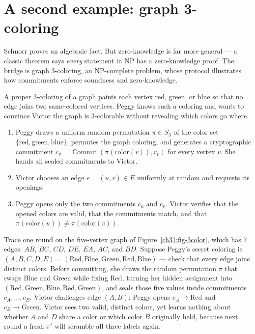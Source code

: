 \section{A second example: graph 3-coloring}
\label{ch31:3color}

Schnorr proves an algebraic fact. But zero-knowledge is far more general --- a
classic theorem says \emph{every} statement in \textsf{NP} has a zero-knowledge
proof. The bridge is graph 3-coloring, an \textsf{NP}-complete problem, whose
protocol illustrates how commitments enforce soundness and zero-knowledge.

A proper 3-coloring of a graph paints each vertex red, green, or blue so that no
edge joins two same-colored vertices. Peggy knows such a coloring and wants to
convince Victor the graph is 3-colorable without revealing which colors go
where.

\begin{enumerate}
  \item Peggy draws a uniform random permutation $\pi \in S_3$ of the color set $\{\text{red}, \text{green}, \text{blue}\}$,
        permutes the graph coloring, and generates a cryptographic commitment $c_v = \operatorname{Commit}(\pi(\text{color}(v)), r_v)$
        for every vertex $v$. She hands all sealed commitments to Victor.
  \item Victor chooses an edge $e = (u,v) \in E$ uniformly at random and requests its openings.
  \item Peggy opens only the two commitments $c_u$ and $c_v$. Victor verifies that the opened colors are valid,
        that the commitments match, and that $\pi(\text{color}(u)) \ne \pi(\text{color}(v))$.
\end{enumerate}

Trace one round on the five-vertex graph of Figure~\ref{ch31:fig-3color}, which has $7$ edges: $AB$, $BC$, $CD$, $DE$, $EA$, $AC$, and $BD$. Suppose Peggy's secret coloring is $(A,B,C,D,E) = (\text{Red}, \text{Blue}, \text{Green}, \text{Red}, \text{Blue})$ --- check that every edge joins distinct colors. Before committing, she draws the random permutation $\pi$ that swaps Blue and Green while fixing Red, turning her hidden assignment into $(\text{Red}, \text{Green}, \text{Blue}, \text{Red}, \text{Green})$, and seals those five values inside commitments $c_A,\dots,c_E$. Victor challenges edge $(A,B)$; Peggy opens $c_A \to \text{Red}$ and $c_B \to \text{Green}$. Victor sees two valid, distinct colors, yet learns nothing about whether $A$ and $D$ share a color or which color $B$ originally held, because next round a fresh $\pi'$ will scramble all three labels again.

